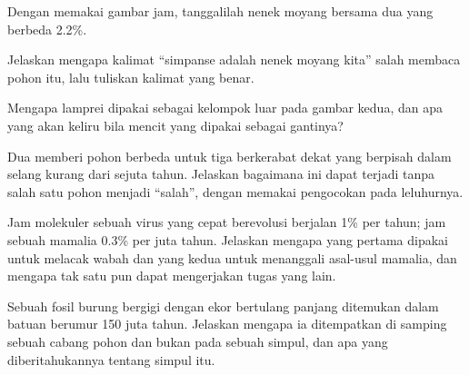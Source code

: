 \begin{exercise}[$\star\star$]\label{exo:g12:phylogenetic-trees:9}
Dengan memakai gambar jam, tanggalilah nenek moyang bersama dua
 yang  berbeda 2.2\%.
\end{exercise}

\begin{exercise}[$\star\star$]\label{exo:g12:phylogenetic-trees:10}
Jelaskan mengapa kalimat ``simpanse adalah nenek moyang kita'' salah
membaca pohon itu, lalu tuliskan kalimat yang benar.
\end{exercise}

\begin{exercise}[$\star\star$]\label{exo:g12:phylogenetic-trees:11}
Mengapa lamprei dipakai sebagai kelompok luar pada gambar kedua, dan
apa yang akan keliru bila mencit yang dipakai sebagai gantinya?
\end{exercise}

\begin{exercise}[$\star\star\star$]\label{exo:g12:phylogenetic-trees:12}
Dua  memberi pohon berbeda untuk tiga  berkerabat dekat yang
berpisah dalam selang kurang dari sejuta tahun. Jelaskan bagaimana ini
dapat terjadi tanpa salah satu pohon menjadi ``salah'', dengan memakai
pengocokan  pada  leluhurnya.
\end{exercise}

\begin{exercise}[$\star\star\star$]\label{exo:g12:phylogenetic-trees:13}
Jam molekuler sebuah virus yang cepat berevolusi berjalan 1\% per
tahun; jam sebuah  mamalia 0.3\% per juta tahun. Jelaskan mengapa
yang pertama dipakai untuk melacak wabah dan yang kedua untuk
menanggali asal-usul mamalia, dan mengapa tak satu pun dapat
mengerjakan tugas yang lain.
\end{exercise}

\begin{exercise}[$\star\star\star$]\label{exo:g12:phylogenetic-trees:14}
Sebuah fosil burung bergigi dengan ekor bertulang panjang ditemukan
dalam batuan berumur 150 juta tahun. Jelaskan mengapa ia ditempatkan
di samping sebuah cabang pohon dan bukan pada sebuah simpul, dan apa
yang diberitahukannya tentang simpul itu.
\end{exercise}

